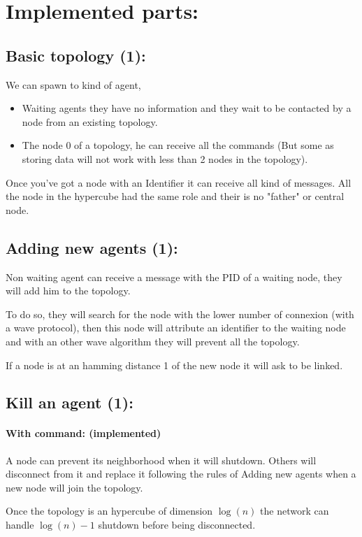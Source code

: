 \documentclass[10pt,a4paper]{article}
\begin{document}
	\section{Implemented parts:}
		\subsection{Basic topology (1):}
			We can spawn to kind of agent,
			\begin{itemize}
				\item Waiting agents they have no information and they wait to be contacted by a node from an existing topology.
				\item The node 0 of a topology, he can receive all the commands (But some as storing data will not work with less than 2 nodes in the topology).
			\end{itemize} 
				\bigbreak
			Once you've got a node with an Identifier it can receive all kind of messages. All the node in the hypercube had the same role and their is no "father" or central node.
			
		\subsection{Adding new agents (1):}
			Non waiting agent can receive a message with the PID of a waiting node, they will add him to the topology.
			
			To do so, they will search for the node with the lower number of connexion (with a wave protocol), then this node will attribute an identifier to the waiting node and with an other wave algorithm they will prevent all the topology.
			
			If a node is at an hamming distance 1 of the new node it will ask to be linked.
		
		\subsection{Kill an agent (1):}
			\paragraph{With command: (implemented)}
				A node can prevent its neighborhood when it will shutdown. Others will disconnect from it and replace it following the rules of Adding new agents when a new node will join the topology.
				
				\medbreak
				Once the topology is an hypercube of dimension $\log(n)$ the network can handle $\log(n) - 1$ shutdown before being disconnected.
				
\end{document}
